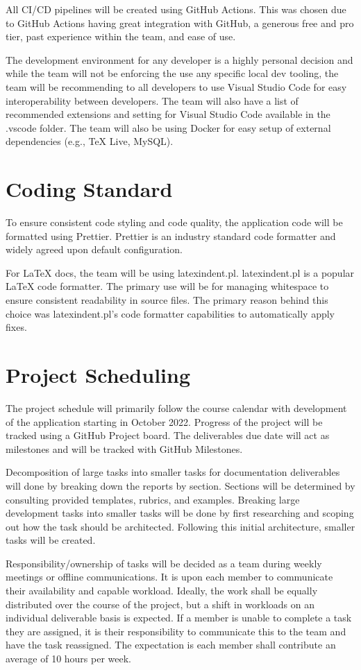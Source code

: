 \documentclass{article}
\begin{document}
All CI/CD pipelines will be created using GitHub Actions. This was chosen due to GitHub Actions
having great integration with GitHub, a generous free and pro tier, past experience within the
team, and ease of use.

The development environment for any developer is a highly personal decision and while the team will
not be enforcing the use any specific local dev tooling, the team will be recommending to all
developers to use Visual Studio Code for easy interoperability between developers. The team will
also have a list of recommended extensions and setting for Visual Studio Code available in the
.vscode folder. The team will also be using Docker for easy setup of external dependencies (e.g.,
TeX Live, MySQL).

\section{Coding Standard}

To ensure consistent code styling and code quality, the application code will be formatted using
Prettier. Prettier is an industry standard code formatter and widely agreed upon default
configuration.

For \LaTeX{} docs, the team will be using latexindent.pl. latexindent.pl is a popular \LaTeX{} code
formatter. The primary use will be for managing whitespace to ensure consistent readability in
source files. The primary reason behind this choice was latexindent.pl's code formatter
capabilities to automatically apply fixes.

\section{Project Scheduling}


The project schedule will primarily follow the course calendar with development of the application
starting in October 2022. Progress of the project will be tracked using a GitHub Project board. The
deliverables due date will act as milestones and will be tracked with GitHub Milestones.

Decomposition of large tasks into smaller tasks for documentation deliverables will done by
breaking down the reports by section. Sections will be determined by consulting provided templates,
rubrics, and examples. Breaking large development tasks into smaller tasks will be done by first
researching and scoping out how the task should be architected. Following this initial
architecture, smaller tasks will be created.

Responsibility/ownership of tasks will be decided as a team during weekly meetings or offline
communications. It is upon each member to communicate their availability and capable workload.
Ideally, the work shall be equally distributed over the course of the project, but a shift in
workloads on an individual deliverable basis is expected. If a member is unable to complete a task
they are assigned, it is their responsibility to communicate this to the team and have the task
reassigned. The expectation is each member shall contribute an average of 10 hours per week.
\end{document}

